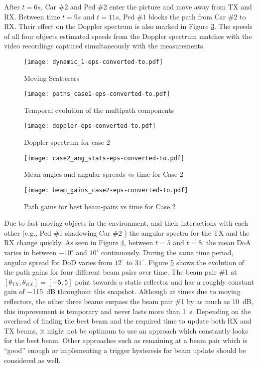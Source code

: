 \documentclass[conference]{IEEEtran}
\begin{document}
After $t=6s$, Car \#2 and Ped \#2 enter the picture and move away from TX and RX. 
Between time $t=9s$ and $t=11s$, Ped \#1 blocks the path from Car \#2 to RX. Their effect on the Doppler spectrum is also marked in Figure \ref{fig:doppler}. The speeds of all four objects estimated speeds from the Doppler spectrum matches with the video recordings captured simultaneously with the measurements. 


\begin{figure}[tbp]
        \centering\texttt{[image: dynamic\_1-eps-converted-to.pdf]}\caption{Moving Scatterers}\label{fig:dynamic2}
\end{figure}

\begin{figure}[tbp]
        \centering\texttt{[image: paths\_case1-eps-converted-to.pdf]}\caption{Temporal evolution of the multipath components}\label{fig:paths}
\end{figure}

\begin{figure}[htbp]
        \centering\texttt{[image: doppler-eps-converted-to.pdf]}\caption{Doppler spectrum for case 2}\label{fig:doppler}
\end{figure}

\begin{figure}[htbp]
        \centering\texttt{[image: case2\_ang\_stats-eps-converted-to.pdf]}\caption{Mean angles and angular spreads vs time for Case 2}\label{fig:case2_ang_stats}
\end{figure}

\begin{figure}[htbp]
        \centering\texttt{[image: beam\_gains\_case2-eps-converted-to.pdf]}\caption{Path gains for best beam-pairs vs  time for Case 2}\label{fig:beam_gains_case2}
\end{figure}


Due to fast moving objects in the environment, and their interactions with each other (e.g., Ped \#1 shadowing Car \#2 ) the angular spectra for the TX and the RX change quickly. As seen in Figure \ref{fig:case2_ang_stats}, between $t=5$ and $t=8$, the mean DoA varies in between $-10^\circ$  and $10^\circ$ continuously. During the same time period, angular spread for DoD varies from $12^\circ$ to $31^\circ$.  Figure \ref{fig:beam_gains_case2} shows the evolution of the path gains for four different beam pairs over time. The beam pair \#1 at $[\theta_{TX},\theta_{RX}]=[-5,5]$ point towards a static reflector and has a roughly constant gain of \SI{-115}{dB} throughout this snapshot. Although at times due to moving reflectors, the other three beams surpass the beam pair  \#1 by as much as \SI{10}{dB}, this improvement is temporary and never lasts more than \SI{1}{s}. Depending on the overhead of finding the best beam and the required time to update both RX and TX beams, it might not be optimum to use an approach which constantly looks for the best beam. Other approaches such as remaining at a beam pair which is ``good''  enough or implementing a trigger hysteresis for beam update should be considered as well.
\end{document}
